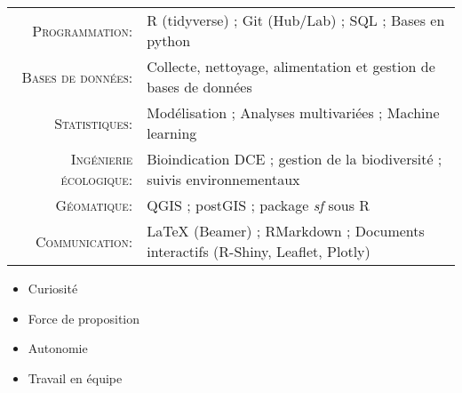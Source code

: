 \documentclass[localFont,alternative]{yaac-another-awesome-cv}
\begin{document}
\makecvheader

\renewcommand{\arraystretch}{1.1}

	\begin{tabular}{>{}r>{}p{13cm}} 
		\textsc{Programmation:}              &    R (tidyverse) ; Git (Hub/Lab) ; SQL ; Bases en python\\ 
		\textsc{Bases de données:}               	&   Collecte, nettoyage, alimentation et gestion de bases de données \\ 
		\textsc{Statistiques:}  	 &   Modélisation ;  Analyses multivariées ; Machine learning \\
		\textsc{Ingénierie écologique:}              &    Bioindication DCE ; gestion de la biodiversité ; suivis environnementaux \\
		\textsc{Géomatique:}			&   QGIS ; postGIS ; package \textit{sf} sous R \\ 
		\textsc{Communication:}               	&   LaTeX (Beamer) ; RMarkdown ; Documents interactifs (R-Shiny, Leaflet, Plotly) 
	\end{tabular}

\twocolumnsection
{
\begin{skills}
\end{skills}}
{
\vspace{1em}
\begin{itemize}
	\item Curiosité
	\item Force de proposition   
	\item Autonomie                 
    \item Travail en équipe 
\end{itemize}
}
\end{document}
